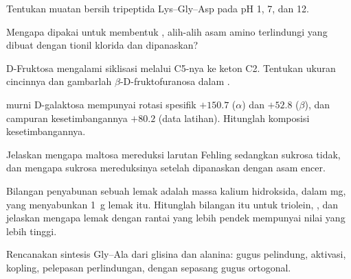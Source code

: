 \begin{exercise}[$\star\star$]\label{exo:b2:biomolecules:5}
Tentukan muatan bersih tripeptida Lys--Gly--Asp pada pH 1, 7, dan 12.
\end{exercise}

\begin{exercise}[$\star\star$]\label{exo:b2:biomolecules:6}
Mengapa  dipakai untuk membentuk , alih-alih
 asam amino terlindungi yang dibuat dengan tionil klorida dan
dipanaskan?
\end{exercise}

\begin{exercise}[$\star\star$]\label{exo:b2:biomolecules:7}
D-Fruktosa mengalami siklisasi melalui  C5-nya ke keton C2. Tentukan
ukuran cincinnya dan gambarlah
$\beta$-D-fruktofuranosa dalam .
\end{exercise}

\begin{exercise}[$\star\star$]\label{exo:b2:biomolecules:8}
 murni D-galaktosa mempunyai rotasi spesifik $+150.7$ ($\alpha$) dan $+52.8$ ($\beta$), dan
campuran kesetimbangannya $+80.2$ (data latihan). Hitunglah komposisi kesetimbangannya.
\end{exercise}

\begin{exercise}[$\star\star$]\label{exo:b2:biomolecules:9}
Jelaskan mengapa maltosa mereduksi larutan Fehling sedangkan sukrosa tidak,
dan mengapa sukrosa mereduksinya setelah dipanaskan dengan asam encer.
\end{exercise}

\begin{exercise}[$\star\star\star$]\label{exo:b2:biomolecules:10}
Bilangan penyabunan sebuah lemak adalah massa kalium hidroksida, dalam mg,
yang menyabunkan 1~g lemak itu. Hitunglah bilangan itu untuk triolein,
, dan jelaskan mengapa lemak dengan rantai yang lebih pendek
mempunyai nilai yang lebih tinggi.
\end{exercise}

\begin{exercise}[$\star\star\star$]\label{exo:b2:biomolecules:11}
Rencanakan sintesis Gly--Ala dari glisina dan alanina: gugus pelindung,
aktivasi, kopling, pelepasan perlindungan, dengan sepasang gugus ortogonal.
\end{exercise}

